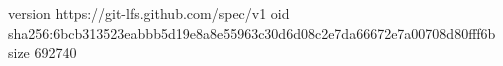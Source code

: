 version https://git-lfs.github.com/spec/v1
oid sha256:6bcb313523eabbb5d19e8a8e55963c30d6d08c2e7da66672e7a00708d80fff6b
size 692740
